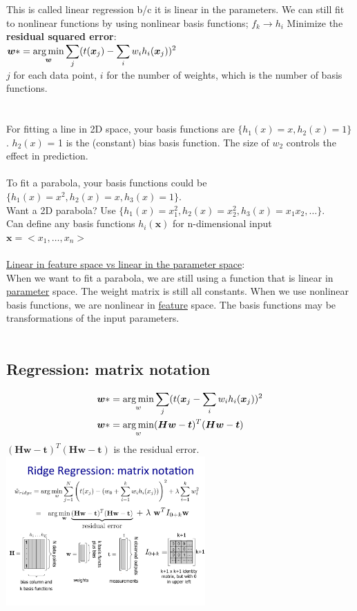 This is called linear regression b/c it is linear in the parameters. 
We can still fit to nonlinear functions by using nonlinear basis functions;  $f_k \rightarrow  h_i$
Minimize the \textbf{residual squared error}: \hfill \\
$ \displaystyle \bm{w}* = \operatorname*{arg\,min}_{\bm{w}}  \sum_j (t(\bm{x}_j) - \sum_i w_i h_i(\bm{x}_j))^2$  \hfill \\
$j$ for each data point, $i$ for the number of weights, which is the number of basis functions.  \hfill \\
\hfill \\  \hfill \\

For fitting a line in 2D space, your basis functions are $\{ h_1(x) = x, h_2(x) = 1 \}$.  $h_2(x)$ = 1 is the (constant) bias basis function.  The size of $w_2$ controls the effect in prediction.    \hfill \\  \hfill \\

To fit a parabola, your basis functions could be $\{ h_1(x) = x^2, h_2(x)=x, h_3(x)=1 \}$.   \hfill \\
Want a 2D parabola? Use $\{ h_1(x) = x_1^2, h_2(x)=x_2^2, h_3(x)=x_1 x_2, \dots \}$. \hfill \\
Can define any basis functions $h_i(\bm{x})$ for n-dimensional input $\bm{x} = <x_1, \dots, x_n>$
\hfill \\  \hfill \\

\underline{Linear in feature space vs linear in the parameter space}:  \hfill \\
When we want to fit a parabola, we are still using a function that is linear in \underline{parameter} space. 
The weight matrix is still all constants. 
When we use nonlinear basis functions, we are nonlinear in \underline{feature} space.  The basis functions may be transformations of the input parameters. 
 \hfill \\ \hfill \\

\subsection{Regression: matrix notation}
\begin{align*}
	\bm{w}* &= \operatorname*{arg\,min}_w \sum_j(t(\bm{x}_j - \sum_i w_i h_i(\bm{x}_j))^2  \\
	\bm{w}* &= \operatorname*{arg\,min}_w (\bm{Hw} -\bm{t})^T (\bm{Hw} -\bm{t})
\end{align*}
$  (\bm{Hw} -\bm{t})^T (\bm{Hw} -\bm{t})$ is the residual error.  
\includegraphics[width=3in]{figures/Least_squares_matricies.pdf}

